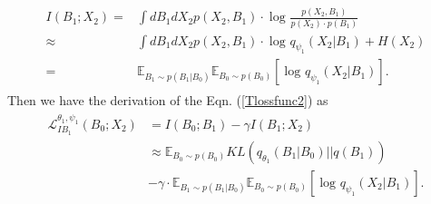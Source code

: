 \begin{align}
\begin{aligned}
I\left ( B_{ 1}; X_{ 2} \right ) =& \int dB_{ 1}dX_{ 2} p\left (X_{ 2},B_{ 1} \right )\cdot \log_{}{\frac{p\left (X_{ 2},B_{ 1} \right )}{p\left (X_{ 2}\right )\cdot p\left (B_{ 1}\right )} } \\\approx &  \int dB_{ 1}dX_{ 2} p\left (X_{ 2},B_{ 1} \right )\cdot \log_{}{q_{\psi _{ 1} }\left (X_{ 2}|B_{ 1} \right ) } + H\left (X_{ 2} \right )  \\=& \mathbb{E} _{B_{ 1}\sim p(B_{ 1}|B_{0})}\mathbb{E} _{B_{0}\sim p(B_{0}) }\left [ \log_{}{q_{\psi _{ 1} } \left ( X_{ 2}|B_{ 1}  \right )  }   \right ].
\end{aligned}
\label{I_Bk_k+1}
\end{align}
Then we have the derivation of the Eqn. (\ref{Tlossfunc2}) as
\begin{align}
\begin{aligned}
\mathcal{L}_{IB_{ 1}}^{\theta _{ 1},\psi _{ 1} } \left ( B_{0}; X_{ 2} \right ) &= I\left ( B_{0}; B_{ 1} \right )-\gamma I\left ( B_{ 1}; X_{ 2} \right ) \\
&\approx \mathbb{E} _{B_{0}\sim p(B_{0}) } KL\left ( q_{\theta _{ 1}}\left ( B_{ 1}|B_{0} \right ) ||q\left ( B_{ 1} \right ) \right )  \\& -\gamma\cdot \mathbb{E} _{B_{ 1}\sim p(B_{ 1}|B_{0})}\mathbb{E} _{B_{0}\sim p(B_{0}) }\left [ \log_{}{q_{\psi _{ 1} } \left ( X_{ 2}|B_{ 1}  \right )  }   \right ].
\end{aligned}
\label{AAlossfunc2}
\end{align}